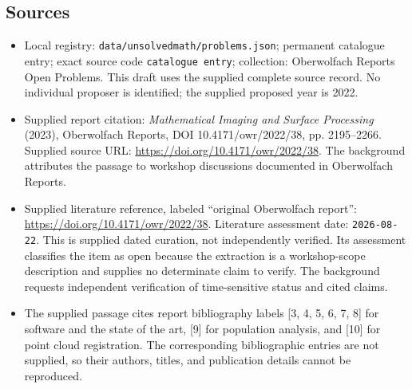 \documentclass[11pt]{article}
\begin{document}
\subsection{Sources}
\begin{itemize}
\item Local registry: \texttt{data/unsolvedmath/problems.json}; permanent catalogue entry; exact source code \texttt{catalogue entry}; collection: Oberwolfach Reports Open Problems. This draft uses the supplied complete source record. No individual proposer is identified; the supplied proposed year is 2022.
\item Supplied report citation: \emph{Mathematical Imaging and Surface Processing} (2023), Oberwolfach Reports, DOI 10.4171/owr/2022/38, pp. 2195--2266. Supplied source URL: \url{https://doi.org/10.4171/owr/2022/38}. The background attributes the passage to workshop discussions documented in Oberwolfach Reports.
\item Supplied literature reference, labeled ``original Oberwolfach report'': \url{https://doi.org/10.4171/owr/2022/38}. Literature assessment date: \texttt{2026-08-22}. This is supplied dated curation, not independently verified. Its assessment classifies the item as open because the extraction is a workshop-scope description and supplies no determinate claim to verify. The background requests independent verification of time-sensitive status and cited claims.
\item The supplied passage cites report bibliography labels [3, 4, 5, 6, 7, 8] for software and the state of the art, [9] for population analysis, and [10] for point cloud registration. The corresponding bibliographic entries are not supplied, so their authors, titles, and publication details cannot be reproduced.
\end{itemize}
\end{document}
